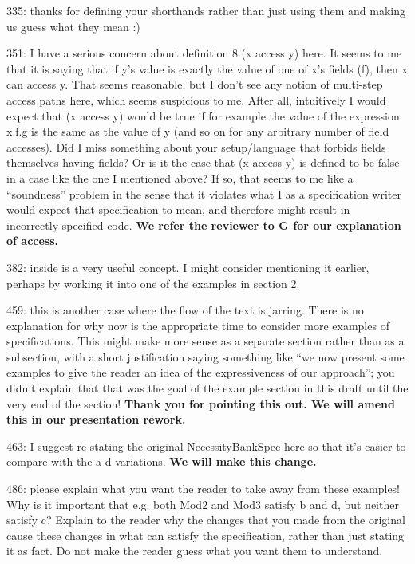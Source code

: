 \documentclass[11pt]{amsart}
\newcommand{\us}[1]{\bf #1}
\begin{document}
335: thanks for defining your shorthands rather than just using them and making us guess what they mean :)

351: I have a serious concern about definition 8 (x access y) here. It seems to me that it is saying that if y’s value is exactly the value of one of x’s fields (f), then x can access y. That seems reasonable, but I don’t see any notion of multi-step access paths here, which seems suspicious to me. After all, intuitively I would expect that (x access y) would be true if for example the value of the expression x.f.g is the same as the value of y (and so on for any arbitrary number of field accesses). Did I miss something about your setup/language that forbids fields themselves having fields? Or is it the case that (x access y) is defined to be false in a case like the one I mentioned above? If so, that seems to me like a “soundness” problem in the sense that it violates what I as a specification writer would expect that specification to mean, and therefore might result in incorrectly-specified code.
{\us{We refer the reviewer to G for our explanation of access.}}

382: inside is a very useful concept. I might consider mentioning it earlier, perhaps by working it into one of the examples in section 2.

459: this is another case where the flow of the text is jarring. There is no explanation for why now is the appropriate time to consider more examples of specifications. This might make more sense as a separate section rather than as a subsection, with a short justification saying something like “we now present some examples to give the reader an idea of the expressiveness of our approach”; you didn’t explain that that was the goal of the example section in this draft until the very end of the section!
{\us{Thank you for pointing this out. We will amend this in our presentation rework.}}

463: I suggest re-stating the original NecessityBankSpec here so that it’s easier to compare with the a-d variations.
{\us{We will make this change.}}

486: please explain what you want the reader to take away from these examples! Why is it important that e.g. both Mod2 and Mod3 satisfy b and d, but neither satisfy c? Explain to the reader why the changes that you made from the original cause these changes in what can satisfy the specification, rather than just stating it as fact. Do not make the reader guess what you want them to understand.
\end{document}

